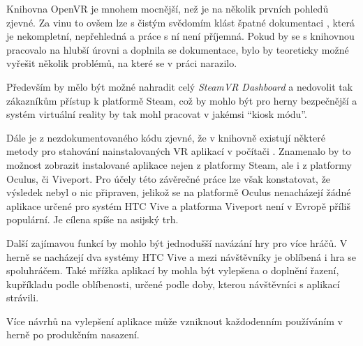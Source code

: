 Knihovna OpenVR je mnohem mocnější, než je na několik prvních pohledů
zjevné. Za vinu to ovšem lze s čistým svědomím klást špatné dokumentaci \autocite{openvrdocs},
která je nekompletní, nepřehledná a práce s ní není příjemná. Pokud by
se s knihovnou pracovalo na hlubší úrovni a doplnila se dokumentace,
bylo by teoreticky možné vyřešit několik problémů, na které se v práci
narazilo.

Především by mělo být možné nahradit celý \emph{SteamVR Dashboard} a
nedovolit tak zákazníkům přístup k platformě Steam, což by mohlo být pro
herny bezpečnější a systém virtuální reality by tak mohl pracovat v
jakémsi ``kiosk módu''. 

Dále je z nezdokumentovaného kódu zjevné, že v
knihovně existují některé metody pro stahování nainstalovaných VR
aplikací v počítači \autocite{openvrhidden}. Znamenalo by to možnost zobrazit instalované aplikace
nejen z platformy Steam, ale i z platformy Oculus, či Viveport. Pro
účely této závěrečné práce lze však konstatovat, že výsledek nebyl o nic
připraven, jelikož se na platformě Oculus nenacházejí žádné aplikace
určené pro systém HTC Vive a platforma Viveport není v Evropě příliš
populární. Je cílena spíše na asijský trh. \autocite{viveportasia}

Další zajímavou funkcí by mohlo být jednodušší navázání hry pro více
hráčů. V herně se nacházejí dva systémy HTC Vive a mezi návštěvníky je
oblíbená i hra se spoluhráčem. Také mřížka aplikací by mohla být vylepšena o
doplnění řazení, kupříkladu podle oblíbenosti, určené podle doby, kterou
návštěvníci s aplikací strávili.

Více návrhů na vylepšení aplikace může vzniknout každodenním používáním
v herně po produkčním nasazení.
